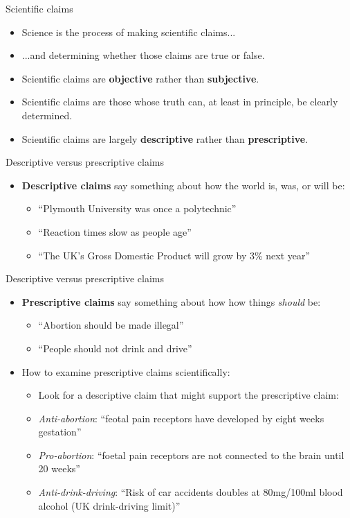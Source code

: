 \documentclass{beamer}
\begin{document}
\begin{frame}{Scientific claims}
	\begin{itemize}
		\item Science is the process of making scientific claims...
		\item ...and determining whether those claims are true or false.
		\item Scientific claims are \textbf{objective} rather than \textbf{subjective}.
		\item Scientific claims are those whose truth can, at least in principle, be clearly determined.
		\item Scientific claims are largely \textbf{descriptive} rather than \textbf{prescriptive}.
	\end{itemize}
\end{frame}

\begin{frame}{Descriptive versus prescriptive claims}
	\begin{itemize}
		\item \textbf{Descriptive claims} say something about how the world is, was, or will be:
		\begin{itemize}
			\item ``Plymouth University was once a polytechnic''
			\item ``Reaction times slow as people age''
			\item ``The UK's Gross Domestic Product will grow by 3\% next year''
		\end{itemize}
	\end{itemize}
\end{frame}


\begin{frame}{Descriptive versus prescriptive claims}
	\begin{itemize}
		\item \textbf{Prescriptive claims} say something about how how things \emph{should} be:
		\begin{itemize}
			\item ``Abortion should be made illegal''
			\item ``People should not drink and drive''
		\end{itemize}
		\item How to examine prescriptive claims scientifically:
		\begin{itemize}
			\item Look for a descriptive claim that might support the prescriptive claim:
			\item \emph{Anti-abortion}: ``feotal pain receptors have developed by eight weeks gestation''
			\item \emph{Pro-abortion}: ``foetal pain receptors are not connected to the brain until 20 weeks''
			\item \emph{Anti-drink-driving}:  ``Risk of car accidents doubles at 80mg/100ml blood alcohol (UK drink-driving limit)''
		\end{itemize}
	\end{itemize}
\end{frame}
			
\end{document}
